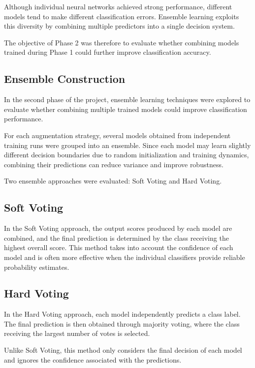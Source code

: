 \documentclass[conference,a4paper]{IEEEtran}
\begin{document}
Although individual neural networks achieved strong performance, different models tend to make different classification errors. Ensemble learning exploits this diversity by combining multiple predictors into a single decision system.

The objective of Phase 2 was therefore to evaluate whether combining models trained during Phase 1 could further improve classification accuracy.

\subsection{Ensemble Construction}

In the second phase of the project, ensemble learning techniques were explored to evaluate whether combining multiple trained models could improve classification performance.

For each augmentation strategy, several models obtained from independent training runs were grouped into an ensemble. Since each model may learn slightly different decision boundaries due to random initialization and training dynamics, combining their predictions can reduce variance and improve robustness.

Two ensemble approaches were evaluated: Soft Voting and Hard Voting.

\subsection{Soft Voting}

In the Soft Voting approach, the output scores produced by each model are combined, and the final prediction is determined by the class receiving the highest overall score. This method takes into account the confidence of each model and is often more effective when the individual classifiers provide reliable probability estimates.

\subsection{Hard Voting}

In the Hard Voting approach, each model independently predicts a class label. The final prediction is then obtained through majority voting, where the class receiving the largest number of votes is selected.

Unlike Soft Voting, this method only considers the final decision of each model and ignores the confidence associated with the predictions.
\end{document}
